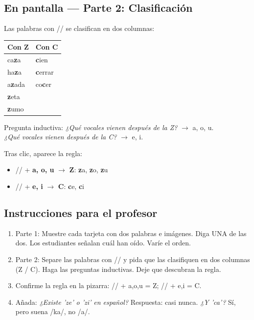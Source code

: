 \documentclass[a4paper,11pt]{article}
\begin{document}
\vspace{0.5cm}

\subsection*{En pantalla — Parte 2: Clasificación}

Las palabras con /\texttheta/ se clasifican en dos columnas:

\begin{center}
\renewcommand{\arraystretch}{1.4}
\begin{tabular}{|>{\centering\arraybackslash}p{5cm}|>{\centering\arraybackslash}p{5cm}|}
\hline
\rowcolor{naranja!15}
\textbf{Con Z} & \textbf{Con C} \\
\hline
ca\textbf{z}a & \textbf{c}ien \\
ha\textbf{z}a & \textbf{c}errar \\
a\textbf{z}ada & co\textbf{c}er \\
\textbf{z}eta & \\
\textbf{z}umo & \\
\hline
\end{tabular}
\end{center}

\vspace{0.3cm}

Pregunta inductiva: \textit{¿Qué vocales vienen después de la Z?} $\rightarrow$ a, o, u.\\
\textit{¿Qué vocales vienen después de la C?} $\rightarrow$ e, i.

\vspace{0.3cm}

Tras clic, aparece la regla:
\begin{itemize}[leftmargin=2cm]
\item /\texttheta/ + \textbf{a, o, u} $\rightarrow$ \textbf{Z}: \textbf{z}a, \textbf{z}o, \textbf{z}u
\item /\texttheta/ + \textbf{e, i} $\rightarrow$ \textbf{C}: \textbf{c}e, \textbf{c}i
\end{itemize}

\vspace{0.5cm}

\subsection*{Instrucciones para el profesor}

\begin{enumerate}[leftmargin=1.5cm, itemsep=4pt]
\item Parte 1: Muestre cada tarjeta con dos palabras e imágenes. Diga UNA de las dos. Los estudiantes señalan cuál han oído. Varíe el orden.
\item Parte 2: Separe las palabras con /\texttheta/ y pida que las clasifiquen en dos columnas (Z / C). Haga las preguntas inductivas. Deje que descubran la regla.
\item Confirme la regla en la pizarra: /\texttheta/ + a,o,u = Z; /\texttheta/ + e,i = C.
\item Añada: \textit{¿Existe 'ze' o 'zi' en español?} Respuesta: casi nunca. \textit{¿Y 'ca'?} Sí, pero suena /ka/, no /\texttheta a/.
\end{enumerate}
\end{document}
